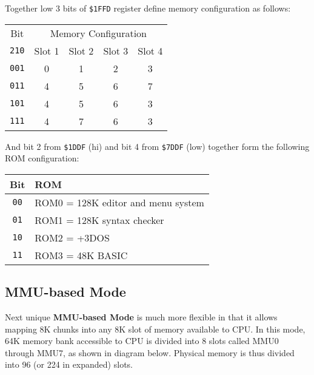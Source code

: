 \documentclass[twoside,openright,a4paper]{book}
\newcommand{\notet}{\rule{0pt}{2.4ex}}
\begin{document}
Together low 3 bits of {\tt \$1FFD} register define memory configuration as follows:

\begin{tabular}{ccccc}
	Bit & \multicolumn{4}{c}{Memory Configuration} \\
	{\tt 210} & Slot 1 & Slot 2 & Slot 3 & Slot 4 \\
	\hline
	{\tt 001}\notet & 0 & 1 & 2 & 3 \\
	{\tt 011} & 4 & 5 & 6 & 7 \\
	{\tt 101} & 4 & 5 & 6 & 3 \\
	{\tt 111} & 4 & 7 & 6 & 3 \\
\end{tabular}

And bit 2 from {\tt \$1DDF} (hi) and bit 4 from {\tt \$7DDF} (low) together form the following ROM configuration:

\begin{tabular}{cl}
	Bit & ROM \\
	\hline
	{\tt 00}\notet & ROM0 = 128K editor and menu system \\
	{\tt 01} & ROM1 = 128K syntax checker \\
	{\tt 10} & ROM2 = +3DOS \\
	{\tt 11} & ROM3 = 48K BASIC \\
\end{tabular}


\subsection{MMU-based Mode}

Next unique \textbf{MMU-based Mode} is much more flexible in that it allows mapping 8K chunks into any 8K slot of memory available to CPU. In this mode, 64K memory bank accessible to CPU is divided into 8 slots called MMU0 through MMU7, as shown in diagram below. Physical memory is thus divided into 96 (or 224 in expanded) slots.
\end{document}
